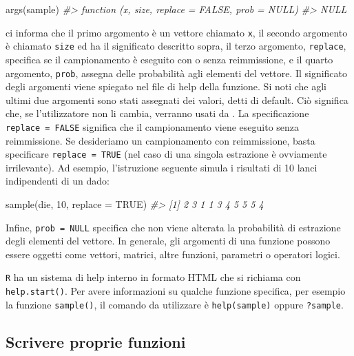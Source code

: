 \documentclass[
]{memoir}
\newenvironment{Shaded}{\begin{snugshade}}{\end{snugshade}}
\newcommand{\AttributeTok}[1]{\textcolor[rgb]{0.77,0.63,0.00}{#1}}
\newcommand{\CommentTok}[1]{\textcolor[rgb]{0.56,0.35,0.01}{\textit{#1}}}
\newcommand{\ConstantTok}[1]{\textcolor[rgb]{0.00,0.00,0.00}{#1}}
\newcommand{\DecValTok}[1]{\textcolor[rgb]{0.00,0.00,0.81}{#1}}
\newcommand{\FunctionTok}[1]{\textcolor[rgb]{0.00,0.00,0.00}{#1}}
\newcommand{\NormalTok}[1]{#1}
\theoremstyle{definition}
\theoremstyle{definition}
\theoremstyle{definition}
\theoremstyle{definition}
\theoremstyle{remark}
\begin{document}
\begin{Shaded}
\begin{Highlighting}[]
\FunctionTok{args}\NormalTok{(sample)}
\CommentTok{\#\textgreater{} function (x, size, replace = FALSE, prob = NULL) }
\CommentTok{\#\textgreater{} NULL}
\end{Highlighting}
\end{Shaded}

ci informa che il primo argomento è un vettore chiamato \texttt{x}, il secondo
argomento è chiamato \texttt{size} ed ha il significato descritto sopra, il
terzo argomento, \texttt{replace}, specifica se il campionamento è eseguito con
o senza reimmissione, e il quarto argomento, \texttt{prob}, assegna delle
probabilità agli elementi del vettore. Il significato degli argomenti
viene spiegato nel file di help della funzione. Si noti che agli ultimi
due argomenti sono stati assegnati dei valori, detti di default. Ciò
significa che, se l'utilizzatore non li cambia, verranno usati da . La
specificazione \texttt{replace\ =\ FALSE} significa che il campionamento viene
eseguito senza reimmissione. Se desideriamo un campionamento con
reimmissione, basta specificare \texttt{replace\ =\ TRUE} (nel caso di una
singola estrazione è ovviamente irrilevante). Ad esempio, l'istruzione
seguente simula i risultati di 10 lanci indipendenti di un dado:

\begin{Shaded}
\begin{Highlighting}[]
\FunctionTok{sample}\NormalTok{(die, }\DecValTok{10}\NormalTok{, }\AttributeTok{replace =} \ConstantTok{TRUE}\NormalTok{)}
\CommentTok{\#\textgreater{}  [1] 2 3 1 1 3 4 5 5 5 4}
\end{Highlighting}
\end{Shaded}

Infine, \texttt{prob\ =\ NULL} specifica che non viene alterata la probabilità di
estrazione degli elementi del vettore. In generale, gli argomenti di una
funzione possono essere oggetti come vettori, matrici, altre funzioni,
parametri o operatori logici.

\texttt{R} ha un sistema di help interno in formato HTML che si richiama con
\texttt{help.start()}. Per avere informazioni su qualche funzione specifica,
per esempio la funzione \texttt{sample()}, il comando da utilizzare è
\texttt{help(sample)} oppure \texttt{?sample}.

\hypertarget{scrivere-proprie-funzioni}{%
\subsection{Scrivere proprie funzioni}\label{scrivere-proprie-funzioni}}
\end{document}
